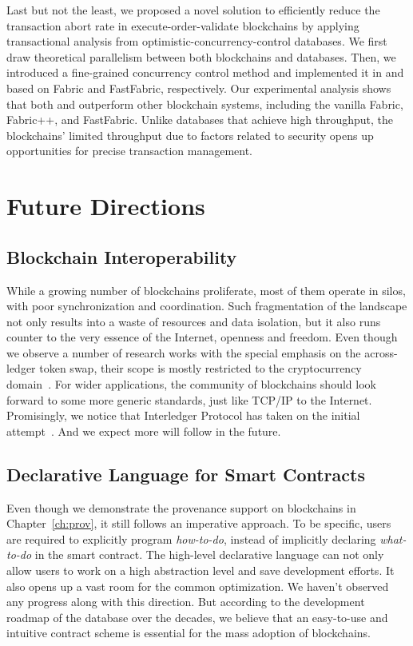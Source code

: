 Last but not the least, we proposed a novel solution to efficiently reduce the transaction abort rate in execute-order-validate blockchains by applying transactional
analysis from optimistic-concurrency-control databases. We first draw theoretical parallelism between both blockchains and databases. Then,
we introduced a fine-grained concurrency control method and
implemented it in {\fs} and {\ffs} based on
Fabric and FastFabric, respectively. 
Our experimental analysis shows that both {\fs} and {\ffs} outperform other blockchain systems, including the vanilla Fabric,
Fabric++, and FastFabric. Unlike databases that achieve high throughput, the blockchains’ limited throughput due to factors related to security opens up opportunities for precise transaction management.

\section{Future Directions}
\subsection{Blockchain Interoperability}
While a growing number of blockchains proliferate, most of them operate in silos, with poor synchronization and coordination. 
Such fragmentation of the landscape not only results into a waste of resources and data isolation, but it also runs counter to the very essence of the Internet, openness and freedom. 
Even though we observe a number of research works with the special emphasis on the across-ledger token swap, their scope is mostly restricted to the cryptocurrency domain~\cite{herlihy2018atomic,robinson2019atomic,zakhary2019atomic}. 
For wider applications, the community of blockchains should look forward to some more generic standards, just like TCP/IP to the Internet. 
Promisingly, we notice that Interledger Protocol has taken on the initial attempt~\cite{interledger}. And we expect more will follow in the future. 

\subsection{Declarative Language for Smart Contracts}
Even though we demonstrate the provenance support on blockchains in Chapter~\ref{ch:prov}, it still follows an imperative approach.
To be specific, users are required to explicitly program \textit{how-to-do}, instead of implicitly declaring \textit{what-to-do} in the smart contract. 
The high-level declarative language can not only allow users to work on a high abstraction level and save development efforts. 
It also opens up a vast room for the common optimization. 
We haven't observed any progress along with this direction.
But according to the development roadmap of the database over the decades, we believe that an easy-to-use and intuitive contract scheme is essential for the mass adoption of blockchains. 

